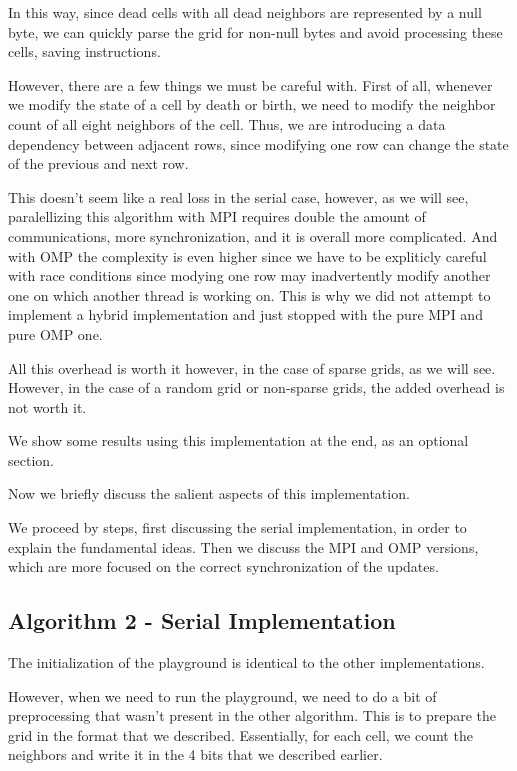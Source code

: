 \documentclass{report}
\begin{document}
In this way, since dead cells with all dead neighbors are represented by a null
byte, we can quickly parse the grid for non-null bytes and avoid processing 
these cells, saving instructions. 

However, there are a few things we must be careful with. First of all, whenever 
we modify the state of a cell by death or birth, we need to modify the neighbor 
count of all eight neighbors of the cell. Thus, we are introducing a data  
dependency between adjacent rows, since modifying one row can change the state 
of the previous and next row. 

This doesn't seem like a real loss in the serial case, however, as we will see, 
paralellizing this algorithm with MPI requires double the amount of 
communications, more synchronization, and it is overall more complicated. 
And with OMP the complexity is even higher since we have to be expliticly careful 
with race conditions since modying one row may inadvertently modify another one 
on which another thread is working on. This is why we did not attempt to 
implement a hybrid implementation and just stopped with the pure MPI and pure 
OMP one. 

All this overhead is worth it however, in the case of sparse grids, as we will 
see. However, in the case of a random grid or non-sparse grids, the added 
overhead is not worth it. 

We show some results using this implementation at the end, as an optional section.

Now we briefly discuss the salient aspects of this implementation. 

We proceed by steps, first discussing the serial implementation, in order to 
explain the fundamental ideas. Then we discuss the MPI and OMP versions, 
which are more focused on the correct synchronization of the updates. 

\subsection{Algorithm 2 - Serial Implementation}

The initialization of the playground is identical to the other implementations.

However, when we need to run the playground, we need to do a bit of preprocessing 
that wasn't present in the other algorithm. This is to prepare the grid 
in the format that we described. Essentially, for each cell, we count the neighbors 
and write it in the 4 bits that we described earlier.
\end{document}
